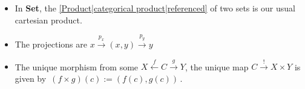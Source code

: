 
\begin{itemize}
    \item  In \textbf{Set}, the \ref{Product|categorical product|referenced} of two sets is our usual cartesian product.
    \item The projections are $x \xrightarrow{p_x}(x,y)\xrightarrow{p_y}y$
    \item The unique morphism from some $X \xleftarrow{f} C \xrightarrow{g} Y$, the unique map $C \xrightarrow{!}X \times Y$ is given by \,$(f\times g)(c):=(f(c),g(c))$\,.
  \end{itemize}
